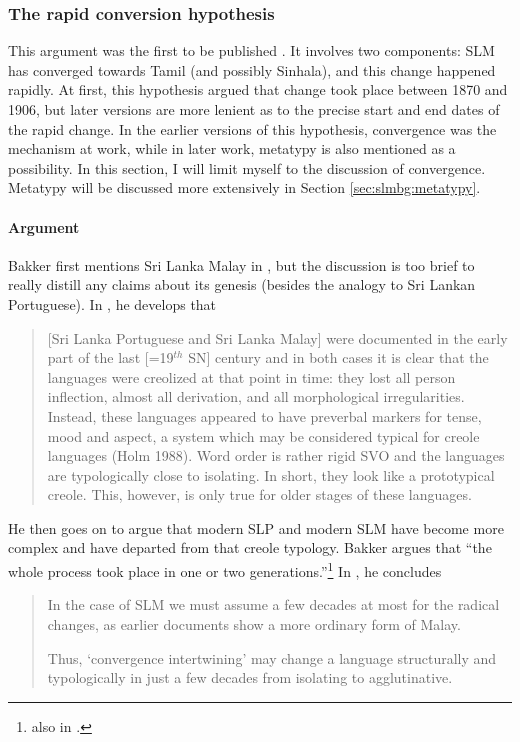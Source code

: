 \subsubsection{The rapid conversion hypothesis}
This argument was the first to be published \citep{Bakker1995nl}. It involves two components: SLM has converged towards Tamil (and possibly Sinhala), and this change happened rapidly. At first, this hypothesis argued that change took place between 1870 and 1906, but later versions \citep{Bakker2006} are more lenient as to the precise start and end dates of the rapid change. In the earlier versions of this hypothesis, convergence was the mechanism at work, while in later work, metatypy is also mentioned as a possibility. In this section, I will limit myself to the discussion of convergence. Metatypy will be discussed more extensively in Section \ref{sec:slmbg:metatypy}.

\paragraph{Argument}
Bakker first mentions Sri Lanka Malay in \citet[17f]{Bakker1995nl}, but the discussion is too brief to really distill any claims about its genesis (besides the analogy to Sri Lankan Portuguese). In \citet{Bakker2000convergence,Bakker2000rapid}, he develops that

\begin{quote}
[Sri Lanka Portuguese and Sri Lanka Malay] were documented in the early part of the last [=19$^{th}$ SN] century and in both cases it is clear that the languages were creolized at that point in time: they lost all person inflection, almost all derivation, and all morphological irregularities. Instead, these languages appeared to have preverbal markers for tense, mood and aspect, a system which may be considered typical for creole languages (Holm 1988)\nocite{Holm1988}. Word order is rather rigid SVO and the languages are typologically close to isolating. In short, they look like a prototypical creole. This, however, is only true for older stages of these languages.
\end{quote}

He then goes on to argue that modern SLP and modern SLM have become more complex and have departed from that creole typology. Bakker argues that ``the whole process took place in one or two generations.''\footnote{also in \citet[153]{Bakker2006}.} 
In \citet[607]{Bakker2000rapid}, he concludes

\begin{quote}
In the case of SLM we must \el{} assume a few decades at most for the radical changes, as earlier documents show a more ordinary form of Malay.

Thus, `convergence intertwining' may change a language structurally and typologically in just a few decades from isolating to agglutinative.
\end{quote}

